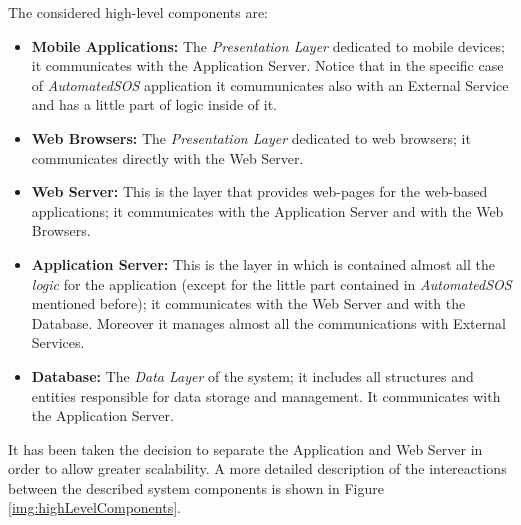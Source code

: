 The considered high-level components are:
\begin{itemize}
  \setlength{\itemindent}{-.4in}
  \item[] \textbf{Mobile Applications:} The \textit{Presentation Layer} dedicated to mobile devices; it communicates with the Application Server. Notice that in the specific case of \textit{AutomatedSOS} application it comumunicates also with an External Service and has a little part of logic inside of it.
  \item[] \textbf{Web Browsers:} The \textit{Presentation Layer} dedicated to web browsers; it communicates directly with the Web Server.
  \item[] \textbf{Web Server:} This is the layer that provides web-pages for the web-based applications; it communicates with the Application Server and with the Web Browsers.
  \item[] \textbf{Application Server:} This is the layer in which is contained almost all the \textit{logic} for the application (except for the little part contained in \textit{AutomatedSOS} mentioned before); it communicates with the Web Server and with the Database. Moreover it manages almost all the communications with External Services.
  \item[] \textbf{Database:}  The \textit{Data Layer} of the system; it includes all structures and entities responsible for data storage and management. It communicates with the Application Server.
\end{itemize}
It has been taken the decision to separate the Application and Web Server in order to allow greater scalability.
A more detailed description of the intereactions between the described system components is shown in Figure \ref{img:highLevelComponents}.

